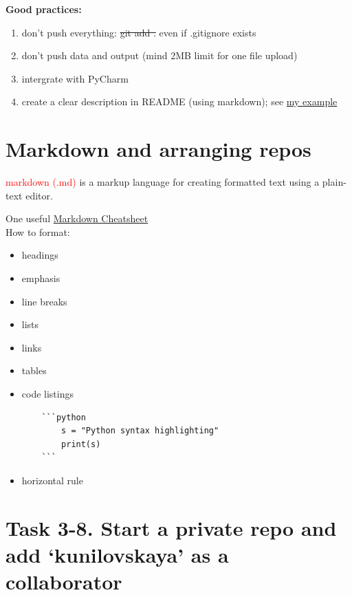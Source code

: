 \documentclass[a4paper,11pt]{article}
\begin{document}
\textbf{Good practices:}
\begin{enumerate}
	\item don't push everything: \st{git add .} even if .gitignore exists
	\item don't push data and output (mind 2MB limit for one file upload)	
	\item intergrate with PyCharm
	\item create a clear description in README (using markdown); see \href{https://github.com/kunilovskaya/malaga_dskills}{my example}

\end{enumerate}

\section{Markdown and arranging repos}



\textcolor{red}{markdown (.md)} is a markup language for creating formatted text using a plain-text editor.

One useful \href{https://github.com/adam-p/markdown-here/wiki/Markdown-Cheatsheet}{Markdown Cheatsheet} \\

How to format:
\begin{itemize}
	\item headings
	\item emphasis
	\item line breaks
	\item lists
	\item links
	\item tables
	\item code listings\\
	\begin{lstlisting}
	```python
		s = "Python syntax highlighting"
		print(s)
	```
	\end{lstlisting}
	\item horizontal rule
	
\end{itemize}

\section*{Task 3-8. Start a private repo and add `kunilovskaya' as a collaborator}
\label{task}
\end{document}
